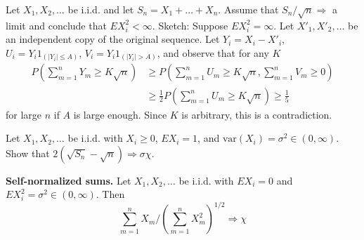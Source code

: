   \begin{exercise}[Durrett 3.4.3]
    Let $X_1, X_2, \dots$ be i.i.d. and let $S_n = X_1 + \dots + X_n$. Assume that $S_n/\sqrt{n} \Rightarrow$ a limit and conclude that $EX_i^2 < \infty$. Sketch: Suppose $EX_i^2 = \infty$. Let $X'_1, X'_2, \dots$ be an independent copy of the original sequence. Let $Y_i = X_i - X'_i$, $U_i = Y_i 1_{(|Y_i| \leq A)}$, $V_i = Y_i 1_{(|Y_i| > A)}$, and observe that for any $K$
    \begin{align*}
      P\left(\sum_{m=1}^n Y_m \geq K\sqrt{n}\right) &\geq P\left(\sum_{m=1}^n U_m \geq K\sqrt{n}, \sum_{m=1}^n V_m \geq 0\right) \\
      &\geq \frac{1}{2} P\left(\sum_{m=1}^n U_m \geq K\sqrt{n}\right) \geq \frac{1}{5}
    \end{align*}
    for large $n$ if $A$ is large enough. Since $K$ is arbitrary, this is a contradiction.
  \end{exercise}
  \begin{solution}

  \end{solution}

  \begin{exercise}[Durrett 3.4.4]
    Let $X_1, X_2, \dots$ be i.i.d. with $X_i \geq 0$, $EX_i = 1$, and $\text{var}(X_i) = \sigma^2 \in (0, \infty)$. Show that $2(\sqrt{S_n} - \sqrt{n}) \Rightarrow \sigma\chi$.
  \end{exercise}
  \begin{solution}

  \end{solution}

  \begin{exercise}[Durrett 3.4.5]
    \textbf{Self-normalized sums.} Let $X_1, X_2, \dots$ be i.i.d. with $EX_i = 0$ and $EX_i^2 = \sigma^2 \in (0, \infty)$. Then
    \begin{equation*}
      \sum_{m=1}^n X_m / \left( \sum_{m=1}^n X_m^2 \right)^{1/2} \Rightarrow \chi
    \end{equation*}
  \end{exercise}
  \begin{solution}

  \end{solution}

